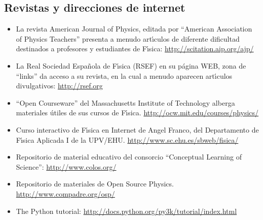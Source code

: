 \subsection{Revistas y direcciones de internet}
\begin{itemize}
\item La revista American Journal of Physics, editada por ``American Association of 
Physics Teachers'' presenta a menudo art\'{\i}culos de diferente dificultad 
destinados a profesores y estudiantes de F\'{\i}sica:
 \href{http://scitation.aip.org/ajp/}{http://scitation.aip.org/ajp/} 

\item La Real Sociedad Espa\~{n}ola de F\'{\i}sica (RSEF) en su p\'{a}gina WEB, 
zona de ``links'' da acceso a su revista, en la cual a menudo aparecen
 art\'{\i}culos divulgativos: \href{http://rsef.org}{http://rsef.org}


\item ``Open Courseware'' del Massachusetts Institute of Technology alberga materiales \'{u}tiles de sus cursos de F\'{\i}sica. 
\href{http://ocw.mit.edu/courses/physics/}{http://ocw.mit.edu/courses/physics/} 


\item Curso interactivo de F\'{\i}sica en Internet de Angel Franco, 
del Departamento de F\'{\i}sica Aplicada I de la UPV/EHU.
\href{http://www.sc.ehu.es/sbweb/fisica/}{http://www.sc.ehu.es/sbweb/fisica/}

\item  Repositorio de material educativo del consorcio ``Conceptual Learning of
 Science'': \href{http://www.colos.org/}{http://www.colos.org/}

\item Repositorio de materiales de Open Source Physics.
\href{http://www.compadre.org/osp/}{http://www.compadre.org/osp/}


\item The Python tutorial: 
\href{http://docs.python.org/py3k/tutorial/index.html}{http://docs.python.org/py3k/tutorial/index.html}


\end{itemize}

